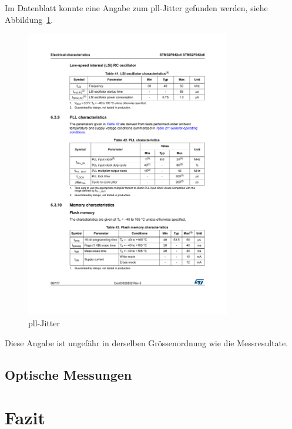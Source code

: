 \documentclass[11pt,a4paper,hidelinks]{article}
\begin{document}
Im Datenblatt konnte eine Angabe zum \acrshort{pll}-Jitter gefunden werden, siehe Abbildung~\ref{fig:pll_jitter}.

\begin{figure}[H]
    \centering
    \includegraphics[width=0.8\textwidth]{graphics/pll_jitter.pdf}
    \caption[\acrshort{pll}-Jitter]{\acrshort{pll}-Jitter \cite{st2017stm32f042k6_datasheet}}\label{fig:pll_jitter}
\end{figure}

Diese Angabe ist ungefähr in derselben Grössenordnung wie die Messresultate.

\pagebreak

\subsection{Optische Messungen}


\pagebreak

\section{Fazit}

\pagebreak
\end{document}
